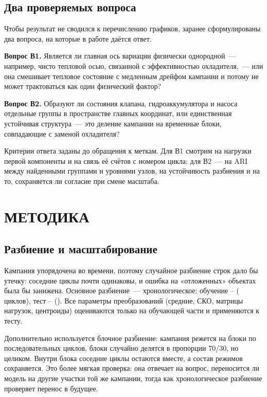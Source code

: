 \documentclass[14pt,a4paper]{extarticle}
\begin{document}


\subsection{Два проверяемых вопроса}

Чтобы результат не сводился к перечислению графиков, заранее
сформулированы два вопроса, на которые в работе даётся ответ.

\textbf{Вопрос В1.} Является ли главная ось вариации физически однородной~---
например, чисто тепловой осью, связанной с эффективностью охладителя,~--- или
она смешивает тепловое состояние с медленным дрейфом кампании и потому не
может трактоваться как один физический фактор?

\textbf{Вопрос В2.} Образуют ли состояния клапана, гидроаккумулятора и насоса
отдельные группы в пространстве главных координат, или единственная
устойчивая структура~--- это деление кампании на временные блоки, совпадающие
с заменой охладителя?

Критерии ответа заданы до обращения к меткам. Для В1 смотрим на нагрузки
первой компоненты и на связь её счётов с номером цикла; для В2~--- на ARI
между найденными группами и уровнями узлов, на устойчивость разбиения и на
то, сохраняется ли согласие при смене масштаба.

\section{МЕТОДИКА}

\subsection{Разбиение и масштабирование}

Кампания упорядочена во времени, поэтому случайное разбиение строк дало бы
утечку: соседние циклы почти одинаковы, и ошибка на «отложенных» объектах
была бы занижена. Основное разбиение~--- хронологическое: обучение
\DataTrainFirst--\DataTrainLast{} (\DataTrain{} циклов), тест
\DataTestFirst--\DataTestLast{} (\DataTest). Все параметры преобразований
(средние, СКО, матрицы нагрузок, центроиды) оцениваются только на обучающей
части и применяются к тесту.

Дополнительно используется блочное разбиение: кампания режется на блоки по
\BlockSize{} последовательных циклов, блоки случайно делятся в пропорции
70/30, но целиком. Внутри блока соседние циклы остаются вместе, а состав
режимов сохраняется. Это более мягкая проверка: она отвечает на вопрос,
переносится ли модель на другие участки той же кампании, тогда как
хронологическое разбиение проверяет перенос в будущее.
\end{document}

